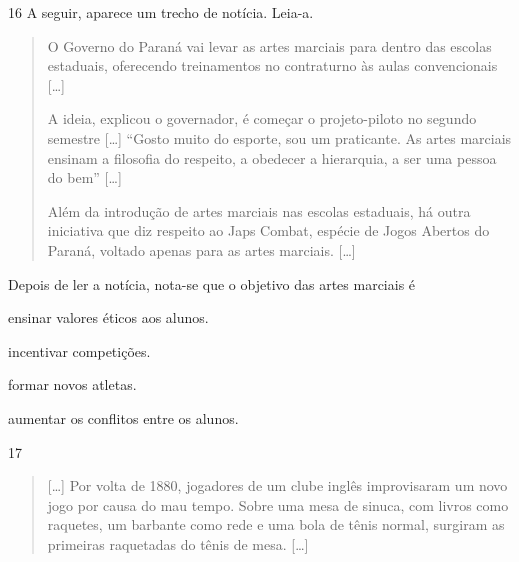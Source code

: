 \num{16} A seguir, aparece um trecho de notícia. Leia-a.
\begin{quote}
  O Governo do Paraná vai levar as artes marciais para dentro das
  escolas estaduais, oferecendo treinamentos no contraturno às aulas
  convencionais {[}\ldots{}{]}

A ideia, explicou o governador, é começar o projeto-piloto no segundo semestre {[}\ldots{}{]} “Gosto muito do esporte, sou
um praticante. As artes marciais ensinam a filosofia do respeito, a
obedecer a hierarquia, a ser uma pessoa do bem” {[}\ldots{}{]}

Além da introdução de artes marciais nas escolas estaduais, há outra
iniciativa que diz respeito ao Japs Combat, espécie de Jogos Abertos do
Paraná, voltado apenas para as artes marciais. {[}\ldots{}{]}

\end{quote}

\noindent{}Depois de ler a notícia, nota-se que o objetivo das artes marciais é

\begin{escolha}
\item ensinar valores éticos aos alunos.

\item incentivar competições.

\item formar novos atletas.

\item aumentar os conflitos entre os alunos.
\end{escolha}


\num{17}
\begin{quote}
  {[}\ldots{}{]} Por volta de 1880, jogadores de um clube inglês improvisaram
  um novo jogo por causa do mau tempo. Sobre uma mesa de sinuca, com
  livros como raquetes, um barbante como rede e uma bola de tênis
  normal, surgiram as primeiras raquetadas do tênis de mesa. {[}\ldots{}{]}


\end{quote}


